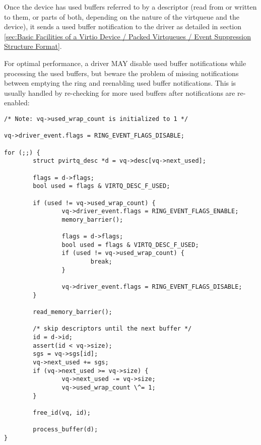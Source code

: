 Once the device has used buffers referred to by a descriptor (read from or written to them, or
parts of both, depending on the nature of the virtqueue and the
device), it sends a used buffer notification to the driver
as detailed in section \ref{sec:Basic
Facilities of a Virtio Device / Packed Virtqueues / Event
Suppression Structure Format}.

\begin{note}

For optimal performance, a driver MAY disable used buffer notifications
while processing the used buffers, but beware the problem of missing
notifications between emptying the ring and reenabling used buffer
notifications.  This is usually handled by re-checking for more used
buffers after notifications are re-enabled:

\end{note}

\begin{lstlisting}
/* Note: vq->used_wrap_count is initialized to 1 */

vq->driver_event.flags = RING_EVENT_FLAGS_DISABLE;

for (;;) {
        struct pvirtq_desc *d = vq->desc[vq->next_used];

        flags = d->flags;
        bool used = flags & VIRTQ_DESC_F_USED;

        if (used != vq->used_wrap_count) {
                vq->driver_event.flags = RING_EVENT_FLAGS_ENABLE;
                memory_barrier();

                flags = d->flags;
                bool used = flags & VIRTQ_DESC_F_USED;
                if (used != vq->used_wrap_count) {
                        break;
                }

                vq->driver_event.flags = RING_EVENT_FLAGS_DISABLE;
        }

        read_memory_barrier();

        /* skip descriptors until the next buffer */
        id = d->id;
        assert(id < vq->size);
        sgs = vq->sgs[id];
        vq->next_used += sgs;
        if (vq->next_used >= vq->size) {
                vq->next_used -= vq->size;
                vq->used_wrap_count \^= 1;
        }

        free_id(vq, id);

        process_buffer(d);
}
\end{lstlisting}
